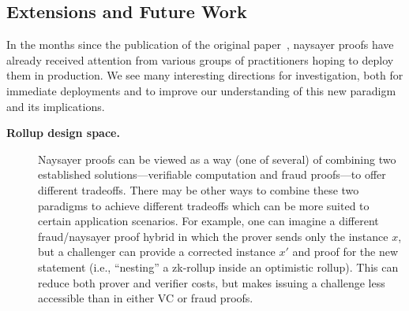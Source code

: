 \subsection{Extensions and Future Work}\label{sec:naysayer_extensions}

In the months since the publication of the original paper~\cite{FC:SerGlaBon24}, naysayer proofs have already received attention from various groups of practitioners hoping to deploy them in production. We see many interesting directions for investigation, both for immediate deployments and to improve our understanding of this new paradigm and its implications.

\begin{description}
    \item[\textbf{Rollup design space.}] Naysayer proofs can be viewed as a way (one of several) of combining two established solutions---verifiable computation and fraud proofs---to offer different tradeoffs. There may be other ways to combine these two paradigms to achieve different tradeoffs which can be more suited to certain application scenarios. For example, one can imagine a different fraud/naysayer proof hybrid in which the prover sends only the instance $x$, but a challenger can provide a corrected instance $x'$ and proof for the new statement (i.e., ``nesting'' a zk-rollup inside an optimistic rollup). This can reduce both prover and verifier costs, but makes issuing a challenge less accessible than in either VC or fraud proofs.
    


\end{description}
